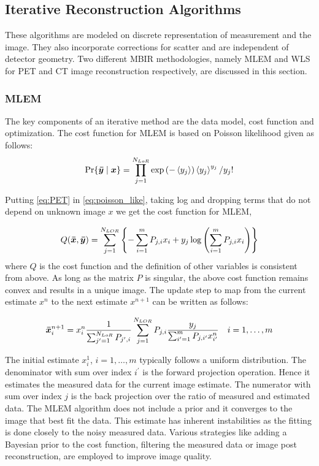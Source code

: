\subsection{Iterative Reconstruction Algorithms}

These algorithms are modeled on discrete representation of measurement and the image. They also incorporate corrections for scatter and are independent of detector geometry. Two different \ac{MBIR} methodologies, namely \ac{MLEM} and \ac{WLS} for \ac{PET} and \ac{CT} image reconstruction respectively, are discussed in this section. 
\subsubsection{\ac{MLEM}}
The key components of an iterative method are the data model, cost function and optimization. The cost function for \ac{MLEM} is based on Poisson likelihood given as follows:
\begin{equation}\label{eq:poisson_like}
\operatorname{Pr}\{\bm{\bar{y}} \mid \bm{x}\}=\prod_{j=1}^{N_{L o R}} \exp \left(-\left\langle y_{j}\right\rangle\right)\left\langle y_{j}\right\rangle^{y_{j}} / y_{j} !
\end{equation}

Putting \ref{eq:PET} in \ref{eq:poisson_like}, taking log and dropping terms that do not depend on unknown image $x$ we get the cost function for \ac{MLEM},

\begin{equation}
Q(\bm{\bar{x}}, \bm{\bar{y}})=\sum_{j=1}^{N_{L O R}}\left\{-\sum_{i=1}^{m} P_{j, i} x_{i}+y_{j} \log \left(\sum_{i=1}^{m} P_{j, i} x_{i}\right)\right\}
\end{equation}
where $Q$ is the cost function and the definition of other variables is consistent from above. As long as the matrix $P$ is singular, the above cost function remains convex and results in a unique image. 
The update step to map from the current estimate $x^{n}$ to the next estimate $x^{n+1}$ can be written as follows:

\begin{equation}
\bm{\bar{x}}_{i}^{n+1}=x_{i}^{n} \frac{1}{\sum_{j^{\prime}=1}^{N_{L o R}} P_{j^{\prime}, i}} \sum_{j=1}^{N_{L O R}} P_{j, i} \frac{y_{j}}{\sum_{i^{\prime}=1}^{m} P_{j, i^{\prime}} x_{i^{\prime}}^{n}} \quad i=1, \ldots, m
\end{equation}

The initial estimate $x_i^{1}$, $i=1, \ldots, m$ typically follows a uniform distribution. The denominator with sum over index $i^{\prime}$ is the forward projection operation. Hence it estimates the measured data for the current image estimate. The numerator with sum over index $j$ is the back projection over the ratio of measured and estimated data. The \ac{MLEM} algorithm does not include a prior and it converges to the image that best fit the data. This estimate has inherent instabilities as the fitting is done closely to the noisy measured data. Various strategies like adding a Bayesian prior to the cost function, filtering the measured data or image post reconstruction, are employed to improve image quality. 

